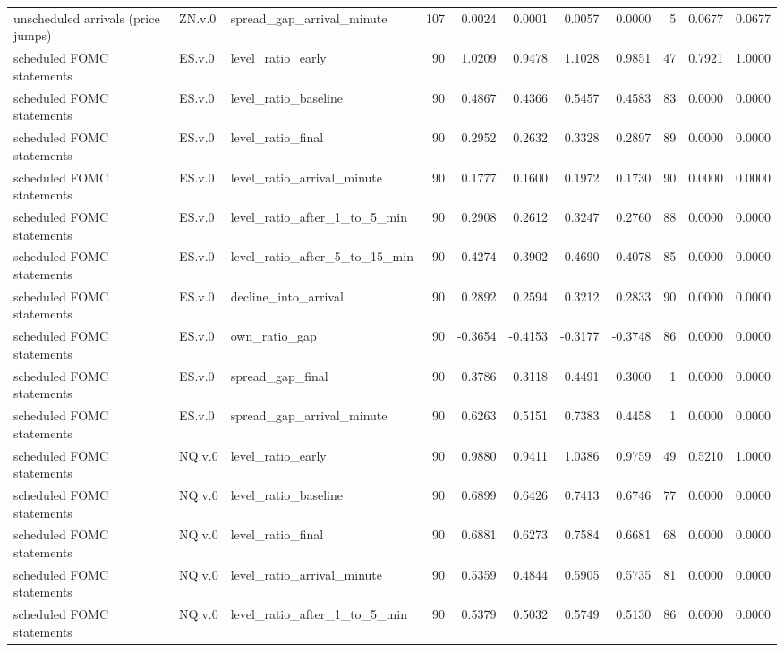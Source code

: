\begin{tabular}{lllrrrrrrrr}
unscheduled arrivals (price jumps) & ZN.v.0 & spread_gap_arrival_minute & 107 & 0.0024 & 0.0001 & 0.0057 & 0.0000 & 5 & 0.0677 & 0.0677 \\
scheduled FOMC statements & ES.v.0 & level_ratio_early & 90 & 1.0209 & 0.9478 & 1.1028 & 0.9851 & 47 & 0.7921 & 1.0000 \\
scheduled FOMC statements & ES.v.0 & level_ratio_baseline & 90 & 0.4867 & 0.4366 & 0.5457 & 0.4583 & 83 & 0.0000 & 0.0000 \\
scheduled FOMC statements & ES.v.0 & level_ratio_final & 90 & 0.2952 & 0.2632 & 0.3328 & 0.2897 & 89 & 0.0000 & 0.0000 \\
scheduled FOMC statements & ES.v.0 & level_ratio_arrival_minute & 90 & 0.1777 & 0.1600 & 0.1972 & 0.1730 & 90 & 0.0000 & 0.0000 \\
scheduled FOMC statements & ES.v.0 & level_ratio_after_1_to_5_min & 90 & 0.2908 & 0.2612 & 0.3247 & 0.2760 & 88 & 0.0000 & 0.0000 \\
scheduled FOMC statements & ES.v.0 & level_ratio_after_5_to_15_min & 90 & 0.4274 & 0.3902 & 0.4690 & 0.4078 & 85 & 0.0000 & 0.0000 \\
scheduled FOMC statements & ES.v.0 & decline_into_arrival & 90 & 0.2892 & 0.2594 & 0.3212 & 0.2833 & 90 & 0.0000 & 0.0000 \\
scheduled FOMC statements & ES.v.0 & own_ratio_gap & 90 & -0.3654 & -0.4153 & -0.3177 & -0.3748 & 86 & 0.0000 & 0.0000 \\
scheduled FOMC statements & ES.v.0 & spread_gap_final & 90 & 0.3786 & 0.3118 & 0.4491 & 0.3000 & 1 & 0.0000 & 0.0000 \\
scheduled FOMC statements & ES.v.0 & spread_gap_arrival_minute & 90 & 0.6263 & 0.5151 & 0.7383 & 0.4458 & 1 & 0.0000 & 0.0000 \\
scheduled FOMC statements & NQ.v.0 & level_ratio_early & 90 & 0.9880 & 0.9411 & 1.0386 & 0.9759 & 49 & 0.5210 & 1.0000 \\
scheduled FOMC statements & NQ.v.0 & level_ratio_baseline & 90 & 0.6899 & 0.6426 & 0.7413 & 0.6746 & 77 & 0.0000 & 0.0000 \\
scheduled FOMC statements & NQ.v.0 & level_ratio_final & 90 & 0.6881 & 0.6273 & 0.7584 & 0.6681 & 68 & 0.0000 & 0.0000 \\
scheduled FOMC statements & NQ.v.0 & level_ratio_arrival_minute & 90 & 0.5359 & 0.4844 & 0.5905 & 0.5735 & 81 & 0.0000 & 0.0000 \\
scheduled FOMC statements & NQ.v.0 & level_ratio_after_1_to_5_min & 90 & 0.5379 & 0.5032 & 0.5749 & 0.5130 & 86 & 0.0000 & 0.0000 \\

\end{tabular}
